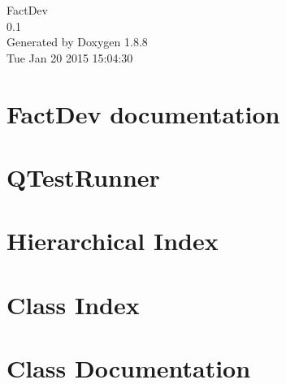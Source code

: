 \documentclass[twoside]{book}
\newcommand{\+}{\discretionary{\mbox{\scriptsize$\hookleftarrow$}}{}{}}
\newcommand{\clearemptydoublepage}{%
  \newpage{\pagestyle{empty}\cleardoublepage}%
}
\begin{document}
\hypersetup{pageanchor=false,
             bookmarks=true,
             bookmarksnumbered=true,
             pdfencoding=unicode
            }
\begin{titlepage}
\vspace*{7cm}
\begin{center}%
{\Large Fact\+Dev \\[1ex]\large 0.\+1 }\\
\vspace*{1cm}
{\large Generated by Doxygen 1.8.8}\\
\vspace*{0.5cm}
{\small Tue Jan 20 2015 15:04:30}\\
\end{center}
\end{titlepage}
\clearemptydoublepage
\tableofcontents
\clearemptydoublepage
{}
\hypersetup{pageanchor=true}

\chapter{Fact\+Dev documentation}
\label{index}\hypertarget{index}{}
\chapter{Q\+Test\+Runner}
\label{dc/d04/md_tests_QTestRunner_README}
\hypertarget{dc/d04/md_tests_QTestRunner_README}{}

\chapter{Hierarchical Index}

\chapter{Class Index}

\chapter{Class Documentation}


































\newpage
{}
{}
\printindex
\end{document}
